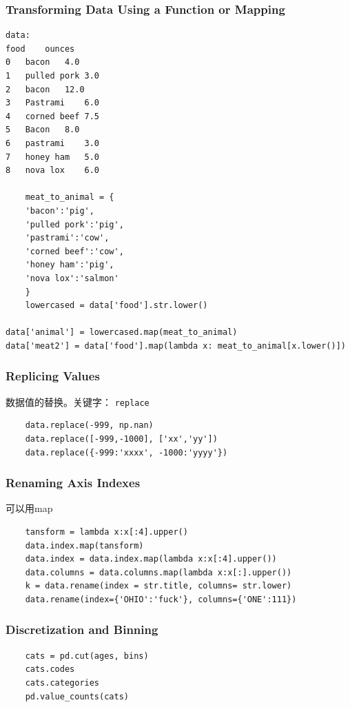 \documentclass{article}
\begin{document}
\subsubsection[基于索引的转换]{Transforming Data Using a Function or Mapping}

\begin{lstlisting}
data:
food	ounces
0	bacon	4.0
1	pulled pork	3.0
2	bacon	12.0
3	Pastrami	6.0
4	corned beef	7.5
5	Bacon	8.0
6	pastrami	3.0
7	honey ham	5.0
8	nova lox	6.0

	meat_to_animal = {
	'bacon':'pig',
	'pulled pork':'pig',
	'pastrami':'cow',
	'corned beef':'cow',
	'honey ham':'pig',
	'nova lox':'salmon'
	}
	lowercased = data['food'].str.lower()
	
data['animal'] = lowercased.map(meat_to_animal)
data['meat2'] = data['food'].map(lambda x: meat_to_animal[x.lower()])	
\end{lstlisting}



\subsubsection{Replicing Values}
数据值的替换。关键字： \verb|replace|

\begin{lstlisting}
	data.replace(-999, np.nan)
	data.replace([-999,-1000], ['xx','yy'])
	data.replace({-999:'xxxx', -1000:'yyyy'})
\end{lstlisting}

\subsubsection[改变索引名称]{Renaming Axis Indexes}
可以用map
\begin{lstlisting}
	tansform = lambda x:x[:4].upper()
	data.index.map(tansform)
	data.index = data.index.map(lambda x:x[:4].upper())
	data.columns = data.columns.map(lambda x:x[:].upper())
	k = data.rename(index = str.title, columns= str.lower)
	data.rename(index={'OHIO':'fuck'}, columns={'ONE':111})	
\end{lstlisting}
\subsubsection[离散与分组]{Discretization and Binning}	

\begin{lstlisting}
	cats = pd.cut(ages, bins)
	cats.codes
	cats.categories
	pd.value_counts(cats)
	
\end{lstlisting}
\end{document}
